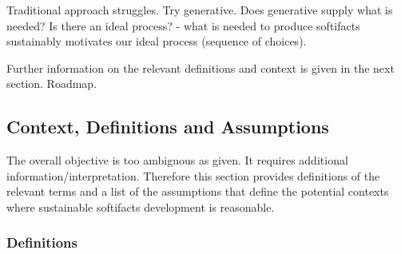 \documentclass[12pt]{article}
\begin{document}
Traditional approach struggles.  Try generative.  Does generative supply what is
needed?  Is there an ideal process?  - what is needed to produce softifacts
sustainably motivates our ideal process (sequence of choices).

Further information on the relevant definitions and context is given in the next
section.  Roadmap.

\subsection*{Context, Definitions and Assumptions} \label{Sec_Context}

The overall objective is too ambiguous as given.  It requires additional
information/interpretation.  Therefore this section provides definitions of the
relevant terms and a list of the assumptions that define the potential contexts
where sustainable softifacts development is reasonable.

\subsubsection*{Definitions}
\end{document}
